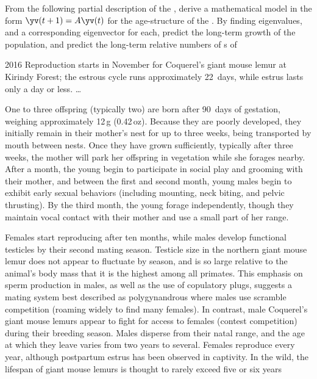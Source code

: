 \begin{OmitV1}
\begin{exercise}  
From the following partial description of the , 
derive a mathematical model in the form \(\yv(t+1)=A\yv(t)\) for the age-structure of the .
By finding eigenvalues, and a corresponding eigenvector for each, predict the long-term growth of the population, and predict the long-term relative numbers of s of 
\begin{quoted}{ 2016 \cite[]{Mittermeier2010,Kappeler2005}}
Reproduction starts in November for Coquerel's giant mouse lemur at Kirindy Forest; the estrous cycle runs approximately 22~days, while estrus lasts only a day or less. \ldots

One to three offspring (typically two) are born after 90~days of gestation, weighing approximately 12\,g (0.42\,oz). Because they are poorly developed, they initially remain in their mother's nest for up to three weeks, being transported by mouth between nests. Once they have grown sufficiently, typically after three weeks, the mother will park her offspring in vegetation while she forages nearby. After a month, the young begin to participate in social play and grooming with their mother, and between the first and second month, young males begin to exhibit early sexual behaviors (including mounting, neck biting, and pelvic thrusting). By the third month, the young forage independently, though they maintain vocal contact with their mother and use a small part of her range.

Females start reproducing after ten months, while males develop functional testicles by their second mating season. Testicle size in the northern giant mouse lemur does not appear to fluctuate by season, and is so large relative to the animal's body mass that it is the highest among all primates. This emphasis on sperm production in males, as well as the use of copulatory plugs, suggests a mating system best described as polygynandrous where males use scramble competition (roaming widely to find many females). In contrast, male Coquerel's giant mouse lemurs appear to fight for access to females (contest competition) during their breeding season. Males disperse from their natal range, and the age at which they leave varies from two years to several. Females reproduce every year, although postpartum estrus has been observed in captivity. In the wild, the lifespan of giant mouse lemurs is thought to rarely exceed five or six years
\end{quoted}
\end{exercise}
\end{OmitV1}



